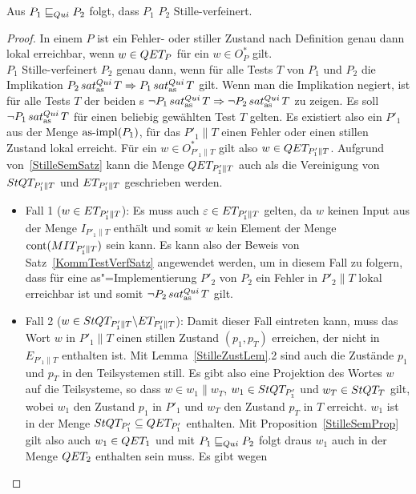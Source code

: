 \begin{Satz}
  \label{StilleTestVerfSatz}
  Aus $P_1 \sqsubseteq  _{Qui} P_2$ folgt, dass $P_1$ $P_2$ Stille-verfeinert.
\end{Satz}
\begin{proof}
  In einem \MEIO{} $P$ ist ein Fehler- oder stiller Zustand nach Definition
  genau dann lokal erreichbar, wenn $w\in QET _P$ für ein $w\in O_P^*$ gilt.\\
  $P_1$ Stille-verfeinert $P_2$ genau dann, wenn für alle Tests $T$ von $P_1$
  und $P_2$ die Implikation $P_2\hspace{0.05cm}sat_\mathrm{as}^{Qui}\hspace{0.05cm} T \Rightarrow P_1\hspace{0.05cm}sat_\mathrm{as}^{Qui}\hspace{0.05cm} T$ gilt. Wenn
  man die Implikation negiert, ist für alle Tests $T$ der beiden \MEIO{}s $\neg
  P_1\hspace{0.05cm}sat_\mathrm{as}^{Qui}\hspace{0.05cm} T \Rightarrow \neg P_2\hspace{0.05cm}sat_\mathrm{as}^{Qui}\hspace{0.05cm} T$ zu zeigen. Es soll $\neg P_1
  \hspace{0.05cm}sat_\mathrm{as}^{Qui}\hspace{0.05cm} T$ für einen beliebig gewählten Test $T$ gelten. Es existiert also
  ein $P'_1$ aus der Menge $\mathrm{as}\text{-}\mathrm{impl} (P_1)$, für das $P'_1\|T$ einen Fehler oder
  einen stillen Zustand lokal erreicht. Für ein $w\in O_{P'_1\|T}^*$ gilt also
  $w\in QET _{P'_1\|T}$. Aufgrund von~\ref{StilleSemSatz} kann die Menge $QET
  _{P'_1\|T}$ auch als die Vereinigung von $StQT _{P'_1\|T}$ und $ET
  _{P'_1\|T}$ geschrieben werden.
  \begin{itemize}
    \item Fall 1 ($w\in ET _{P'_1\|T}$): Es muss auch $\varepsilon\in ET
      _{P'_1\|T}$ gelten, da $w$ keinen Input aus der Menge $I _{P'_1\|T}$
      enthält und somit $w$ kein Element der Menge $\mathrm{cont} (MIT _{P'_1\|T})$
      sein kann. Es kann also der Beweis von Satz~\ref{KommTestVerfSatz}
      angewendet werden, um in diesem Fall zu folgern, dass für eine
      as"=Implementierung $P'_2$ von $P_2$ ein Fehler in $P'_2\|T$ lokal
      erreichbar ist und somit $\neg P_2\hspace{0.05cm}sat_\mathrm{as}^{Qui}\hspace{0.05cm} T$ gilt.
    \item Fall 2 ($w\in StQT _{P'_1\|T}\backslash ET _{P'_1\|T}$): Damit dieser
      Fall eintreten kann, muss das Wort $w$ in $P'_1\|T$ einen stillen
      Zustand $(p_1,p_T)$ erreichen, der nicht in $E_{P'_1\|T}$ enthalten ist.
      Mit Lemma~\ref{StilleZustLem}.2 sind auch die Zustände $p_1$ und $p_T$ in
      den Teilsystemen still. Es gibt also eine Projektion des Wortes $w$ auf
      die Teilsysteme, so dass $w\in w_1\|w_T$, $w_1\in StQT _{P'_1}$ und
      $w_T\in StQT _T$ gilt, wobei $w_1$ den Zustand $p_1$ in $P'_1$ und $w_T$
      den Zustand $p_T$ in $T$ erreicht. $w_1$ ist in der Menge $StQT _{P'_1}
      \subseteq QET _{P'_1}$ enthalten. Mit Proposition~\ref{StilleSemProp}
      gilt also auch $w_1\in QET _1$ und mit $P_1 \sqsubseteq  _{Qui} P_2$ folgt draus
      $w_1$ auch in der Menge $QET _2$ enthalten sein muss. Es gibt wegen

\end{itemize}
\end{proof}
